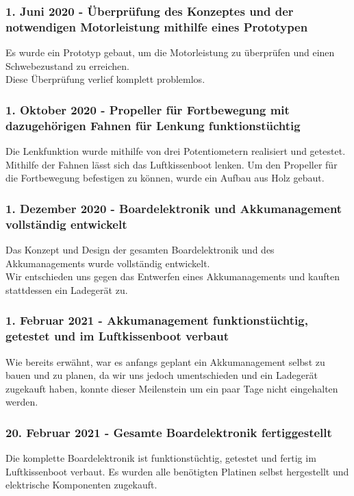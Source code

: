
\subsubsection*{1. Juni 2020 - Überprüfung des Konzeptes und der notwendigen Motorleistung mithilfe eines Prototypen}
Es wurde ein Prototyp gebaut, um die Motorleistung zu überprüfen und einen Schwebezustand zu erreichen. \\
Diese Überprüfung verlief komplett problemlos.  \\

\subsubsection*{1. Oktober 2020 - Propeller für Fortbewegung mit dazugehörigen Fahnen für Lenkung funktionstüchtig}
Die Lenkfunktion wurde mithilfe von drei Potentiometern realisiert und getestet. Mithilfe der Fahnen lässt sich das Luftkissenboot lenken. Um den Propeller für 
die Fortbewegung befestigen zu können, wurde ein Aufbau aus Holz gebaut.  \\

\subsubsection*{1. Dezember 2020 - Boardelektronik und  Akkumanagement vollständig entwickelt}
Das Konzept und Design der gesamten Boardelektronik und des Akkumanagements wurde  vollständig entwickelt. \\
Wir entschieden uns gegen das Entwerfen eines Akkumanagements und kauften stattdessen ein Ladegerät zu.\\

\subsubsection*{1. Februar 2021 - Akkumanagement funktionstüchtig, getestet und im Luftkissenboot verbaut}
Wie bereits erwähnt, war es anfangs geplant ein Akkumanagement selbst zu bauen und zu planen, da wir uns jedoch umentschieden und ein Ladegerät zugekauft haben, konnte dieser Meilenstein um ein paar Tage 
nicht eingehalten werden. \\


\subsubsection*{20. Februar 2021 - Gesamte Boardelektronik fertiggestellt}
Die komplette Boardelektronik ist funktionstüchtig, getestet und fertig im Luftkissenboot verbaut. Es wurden alle benötigten Platinen selbst hergestellt
und elektrische Komponenten zugekauft. 

